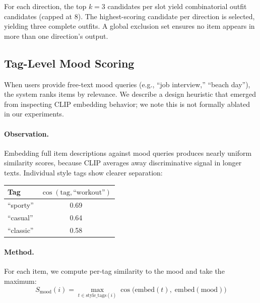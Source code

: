 \documentclass[10pt,twocolumn]{article}
\begin{document}
For each direction, the top $k{=}3$ candidates per slot yield combinatorial
outfit candidates (capped at 8).  The highest-scoring candidate per direction
is selected, yielding three complete outfits.  A global exclusion set ensures
no item appears in more than one direction's output.

\subsection{Tag-Level Mood Scoring}
\label{sec:tag_mood}

When users provide free-text mood queries (e.g., ``job interview,'' ``beach
day''), the system ranks items by relevance.  We describe a design heuristic
that emerged from inspecting CLIP embedding behavior; we note this is not
formally ablated in our experiments.

\paragraph{Observation.}
Embedding full item descriptions against mood queries produces nearly
uniform similarity scores, because CLIP averages away discriminative signal
in longer texts.  Individual style tags show clearer separation:

\vspace{4pt}
\begin{center}
\small
\begin{tabular}{lc}
\toprule
Tag & $\cos(\text{tag}, \text{``workout''})$ \\
\midrule
``sporty'' & 0.69 \\
``casual'' & 0.64 \\
``classic'' & 0.58 \\
\bottomrule
\end{tabular}
\end{center}
\vspace{4pt}

\paragraph{Method.}
For each item, we compute per-tag similarity to the mood and take the
maximum:
\begin{equation}
  S_{\text{mood}}(i) = \max_{t \in \text{style\_tags}(i)}
    \cos\!\big(\text{embed}(t),\; \text{embed}(\text{mood})\big)
\end{equation}

\end{document}
